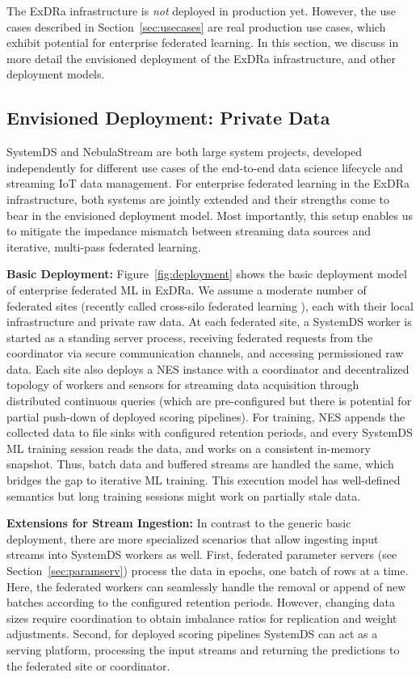 \documentclass[sigconf,screen]{acmart}
\begin{document}
The ExDRa infrastructure is \emph{not} deployed in production yet. However, the use cases described in Section~\ref{sec:usecases} are real production use cases, which exhibit potential for enterprise federated learning. In this section, we discuss in more detail the envisioned deployment of the ExDRa infrastructure, and other deployment models.

\subsection{Envisioned Deployment: Private Data}
\label{sec:basicdeploy}

SystemDS and NebulaStream are both large system projects, developed independently for different use cases of the end-to-end data science lifecycle and streaming IoT data management. For enterprise federated learning in the ExDRa infrastructure, both systems are jointly extended and their strengths come to bear in the envisioned deployment model. Most importantly, this setup enables us to mitigate the impedance mismatch between streaming data sources and iterative, multi-pass federated learning.

\textbf{Basic Deployment:} Figure~\ref{fig:deployment} shows the basic deployment model of enterprise federated ML in ExDRa. We assume a moderate number of federated sites (recently called cross-silo federated learning \cite{Smith20}), each with their local infrastructure and private raw data. At each federated site, a SystemDS worker is started as a standing server process, receiving federated requests from the coordinator via secure communication channels, and accessing permissioned raw data. Each site also deploys a NES instance with a coordinator and decentralized topology of workers and sensors for streaming data acquisition through distributed continuous queries (which are pre-configured but there is potential for partial push-down of deployed scoring pipelines). For training, NES appends the collected data to file sinks with configured retention periods, and every SystemDS ML training session reads the data, and works on a consistent in-memory snapshot. Thus, batch data and buffered streams are handled the same, which bridges the gap to iterative ML training. This execution model has well-defined semantics but long training sessions might work on partially stale data.

\textbf{Extensions for Stream Ingestion:} In contrast to the generic basic deployment, there are more specialized scenarios that allow ingesting input streams into SystemDS workers as well. First, federated parameter servers (see Section~\ref{sec:paramserv}) process the data in epochs, one batch of rows at a time. Here, the federated workers can seamlessly handle the removal or append of new batches according to the configured retention periods. However, changing data sizes require coordination to obtain imbalance ratios for replication and weight adjustments. Second, for deployed scoring pipelines SystemDS can act as a serving platform, processing the input streams and returning the predictions to the federated site or coordinator.  
\end{document}
